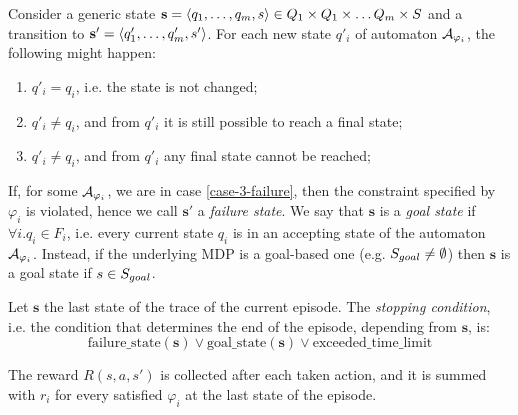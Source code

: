 Consider a generic state $\mathbf{s}=\langle q_1, \dots, q_m, s \rangle\in Q_1\times Q_1\times \dots Q_m \times S$ and a transition to $\mathbf{s'}=\langle q'_1, \dots, q'_m, s' \rangle$. For each new state $q'_i$ of automaton $\mathcal{A}_{\varphi_i}$, the following might happen:
\begin{enumerate}
	\item $q'_i = q_i$, i.e. the state is not changed;\label{case-1-nochange}
	\item $q'_i \neq q_i$, and from $q'_i$ it is still possible to reach a final state;\label{case-2-change}
	\item $q'_i \neq q_i$, and from $q'_i$ any final state cannot be reached;\label{case-3-failure}
\end{enumerate}
If, for some $\mathcal{A}_{\varphi_i}$, we are in case \ref{case-3-failure}, then the constraint specified by $\varphi_i$ is violated, hence we call $\mathbf{s'}$ a \emph{failure state}. We say that $\mathbf{s}$ is a \emph{goal state} if $\forall i. q_i \in F_i$, i.e. every current state $q_i$ is in an accepting state of the automaton $\mathcal{A}_{\varphi_i}$. Instead, if the underlying MDP is a goal-based one (e.g. $S_{goal}\neq \emptyset$) then $\mathbf{s}$ is a goal state if $s\in S_{goal}$.

Let $\mathbf{s}$ the last state of the trace of the current episode. The \emph{stopping condition}, i.e. the condition that determines the end of the episode, depending from $\mathbf{s}$, is:
$$
\mathrm{failure\_state}(\mathbf{s}) \vee \mathrm{goal\_state}(\mathbf{s}) \vee \mathrm{exceeded\_time\_limit}
$$

The reward $R(s,a,s')$ is collected after each taken action, and it is summed with $r_i$ for every satisfied $\varphi_i$ at the last state of the episode.

